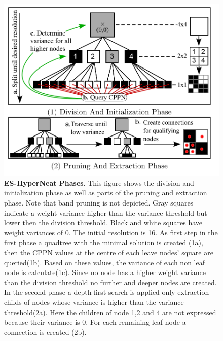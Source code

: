 \begin{figure}[tb]
	\centering
	\includegraphics[width=0.7\linewidth]{figures/ES-HyperNEAT/Es-HyperNEATPhases}
	\caption[ES-HyperNeat Phases]{\textbf{ES-HyperNeat Phases}. This figure shows the division and initialization phase as well as parts of the pruning and extraction phase. Note that band pruning is not depicted. Gray squares indicate a weight variance higher than the variance threshold but lower then the division threshold. Black and white squares have weight variances of 0. The initial resolution is 16. As first step in the first phase a quadtree with the minimal solution is created (1a), then the CPPN values at the centre of each leave nodes' square are queried(1b). Based on these values, the variance of each non leaf node is calculate(1c). Since no node has a higher weight variance than the division threshold no further and deeper nodes are created. In the second phase a depth first search is applied only extraction childs of nodes whose variance is higher than the variance threshold(2a). Here the children of node 1,2 and 4 are not expressed because their variance is 0. For each remaining leaf node a connection is created (2b). \cite[p. 14]{ESHyperNEATarticle} }
	\label{fig:es-hyperneatphases}
\end{figure}




